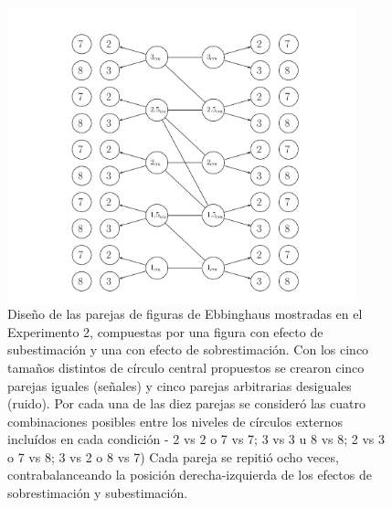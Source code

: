 \begin{itemize}
\begin{figure}[th]
\centering
\includegraphics[width=0.9\textwidth]{Figures/Estimulos_Experimento2} 
\decoRule
\caption[Diseño de Estímulos en el Experimento 2]{Diseño de las parejas de figuras de Ebbinghaus mostradas en el Experimento 2, compuestas por una figura con efecto de subestimación y una con efecto de sobrestimación. Con los cinco tamaños distintos de círculo central propuestos se crearon cinco parejas iguales (señales) y cinco parejas arbitrarias desiguales (ruido). Por cada una de las diez parejas se consideró las cuatro combinaciones posibles entre los niveles de círculos externos incluídos en cada condición - 2 vs 2 o 7 vs 7; 3 vs 3 u 8 vs 8; 2 vs 3 o 7 vs 8; 3 vs 2 o 8 vs 7) Cada pareja se repitió ocho veces, contrabalanceando la posición derecha-izquierda de los efectos de sobrestimación y subestimación.}
\label{fig:Exp_2}
\end{figure}
\end{itemize}


